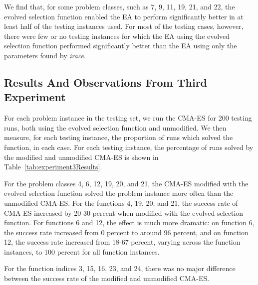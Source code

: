 \documentclass[sigconf]{acmart}
\begin{document}
We find that, for some problem classes, such as 7, 9, 11, 19, 21, and 22, the evolved selection function enabled the EA to perform significantly better in at least half of the testing instances used. For most of the testing cases, however, there were few or no testing instances for which the EA using the evolved selection function performed significantly better than the EA using only the parameters found by \textit{irace}. 

\subsection{Results And Observations From Third Experiment}
\label{thirdExperimentResults}

For each problem instance in the testing set, we run the CMA-ES for 200 testing runs, both using the evolved selection function and unmodified. We then measure, for each testing instance, the proportion of runs which solved the function, in each case. For each testing instance, the percentage of runs solved by the modified and unmodified CMA-ES is shown in Table~\ref{tab:experiment3Results}.

For the problem classes 4, 6, 12, 19, 20, and 21, the CMA-ES modified with the evolved selection function solved the problem instance more often than the unmodified CMA-ES. For the functions 4, 19, 20, and 21, the success rate of CMA-ES increased by 20-30 percent when modified with the evolved selection function. For functions 6 and 12, the effect is much more dramatic: on function 6, the success rate increased from 0 percent to around 96 percent, and on function 12, the success rate increased from 18-67 percent, varying across the function instances, to 100 percent for all function instances.

For the function indices 3, 15, 16, 23, and 24, there was no major difference between the success rate of the modified and unmodified CMA-ES.
\end{document}
